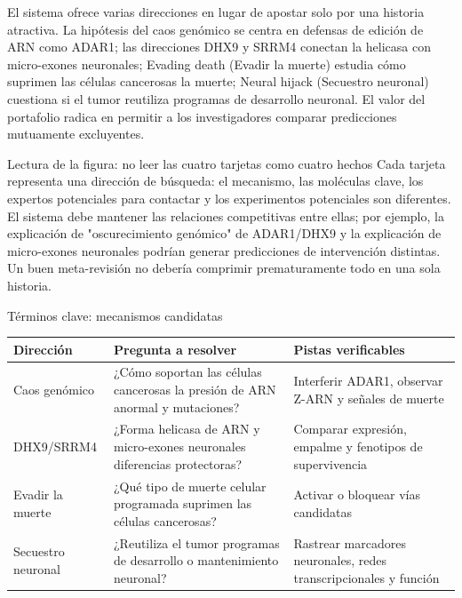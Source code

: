 El sistema ofrece varias direcciones en lugar de apostar solo por una historia atractiva. La hipótesis del caos genómico se centra en defensas de edición de ARN como ADAR1; las direcciones DHX9 y SRRM4 conectan la helicasa con micro-exones neuronales; Evading death (Evadir la muerte) estudia cómo suprimen las células cancerosas la muerte; Neural hijack (Secuestro neuronal) cuestiona si el tumor reutiliza programas de desarrollo neuronal. El valor del portafolio radica en permitir a los investigadores comparar predicciones mutuamente excluyentes.


\begin{knowledgebox}{Lectura de la figura: no leer las cuatro tarjetas como cuatro hechos}
Cada tarjeta representa una dirección de búsqueda: el mecanismo, las moléculas clave, los expertos potenciales para contactar y los experimentos potenciales son diferentes. El sistema debe mantener las relaciones competitivas entre ellas; por ejemplo, la explicación de "oscurecimiento genómico" de ADAR1/DHX9 y la explicación de micro-exones neuronales podrían generar predicciones de intervención distintas. Un buen meta-revisión no debería comprimir prematuramente todo en una sola historia.
\end{knowledgebox}

\begin{knowledgebox}{Términos clave: mecanismos candidatas}
\begin{tabularx}{\textwidth}{L{0.22\textwidth}X X}
\toprule
Dirección & Pregunta a resolver & Pistas verificables \\
\midrule
Caos genómico & ¿Cómo soportan las células cancerosas la presión de ARN anormal y mutaciones? & Interferir ADAR1, observar Z-ARN y señales de muerte \\
DHX9/SRRM4 & ¿Forma helicasa de ARN y micro-exones neuronales diferencias protectoras? & Comparar expresión, empalme y fenotipos de supervivencia \\
Evadir la muerte & ¿Qué tipo de muerte celular programada suprimen las células cancerosas? & Activar o bloquear vías candidatas \\
Secuestro neuronal & ¿Reutiliza el tumor programas de desarrollo o mantenimiento neuronal? & Rastrear marcadores neuronales, redes transcripcionales y función \\
\bottomrule
\end{tabularx}
\end{knowledgebox}

